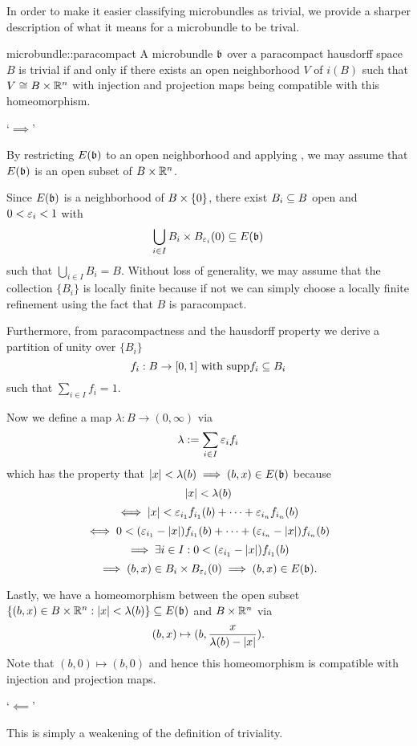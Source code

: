 \begin{myparagraph}
    In order to make it easier classifying microbundles as trivial,
    we provide a sharper description of what it means for a microbundle to be trival. 
\end{myparagraph}

\begin{mylemma}{microbundle::paracompact}
    A microbundle $\mathfrak{b}$ over a paracompact hausdorff space $B$ is trivial
    if and only if there exists an open neighborhood $V$ of $i(B)$ such that $V \cong B \times \mathbb{R}^n$
    with injection and projection maps being compatible with this homeomorphism.
\end{mylemma}

\begin{myproof}
    `$\implies$'

    By restricting $E(\mathfrak{b})$ to an open neighborhood and applying ,
    we may assume that $E(\mathfrak{b})$ is an open subset of $B \times \mathbb{R}^n$.

    Since $E(\mathfrak{b})$ is a neighborhood of $B \times{} \{0\}$, there exist $B_i \subseteq{} B$ open and $0 < \varepsilon{}_i < 1$ with
    \[ \bigcup_{i \in I } B_i \times \ball[\eps_i] \sub E(\bb)\]
    such that $\bigcup_{i \in I} B_i = B$.
    Without loss of generality, we may assume that the collection $\{B_i\}$ is locally finite because if not
    we can simply choose a locally finite refinement using the fact that $B$ is paracompact.

    Furthermore, from paracompactness and the hausdorff property we derive a partition of unity over $\{B_i\}$
    \[ f_i: B \to [0, 1] \text{ with } \text{supp}{f_i} \subseteq{} B_i\]
    such that $\sum_{i \in I}f_i = 1$.
    
    Now we define a map $\lambda: B \to (0, \infty)$ via
    \[ \lambda := \sum_{i \in I} \varepsilon{}_i f_i \]
    which has the property that $\vert{} x \vert{} < \lambda(b) \implies (b, x) \in E(\mathfrak{b})$ because
    \[ \vert{} x \vert{} < \lambda(b) \]
    \[ \iff  \vert{} x \vert{} < \varepsilon{}_{i_1} f_{i_1}(b) + \cdots + \varepsilon{}_{i_n} f_{i_n}(b) \]
    \[ \iff 0 < (\varepsilon{}_{i_1} - \vert{} x \vert{}) f_{i_1}(b) + \cdots + (\varepsilon{}_{i_n} - \vert{} x \vert{}) f_{i_n}(b) \]
    \[ \implies \exists i \in I: 0 < (\varepsilon{}_{i_1} - \vert{} x \vert{}) f_{i_1}(b) \]
    \[ \implies (b, x) \in B_i \times \ball[\eps_i]  \implies (b, x) \in E(\bb). \]

    Lastly, we have a homeomorphism between the open subset
    $\{(b, x) \in B \times \mathbb{R}^n:\vert{} x \vert{} < \lambda(b)\} \subseteq{} E(\mathfrak{b})$ and $B \times \mathbb{R}^n$ via
    \[ (b, x) \mapsto (b, \frac{x}{\lambda(b) - \vert{} x \vert{}}). \]
    Note that $(b, 0) \mapsto (b, 0)$ and hence this homeomorphism is compatible with injection and projection maps.

    `$\impliedby$'

    This is simply a weakening of the definition of triviality. 
\end{myproof}